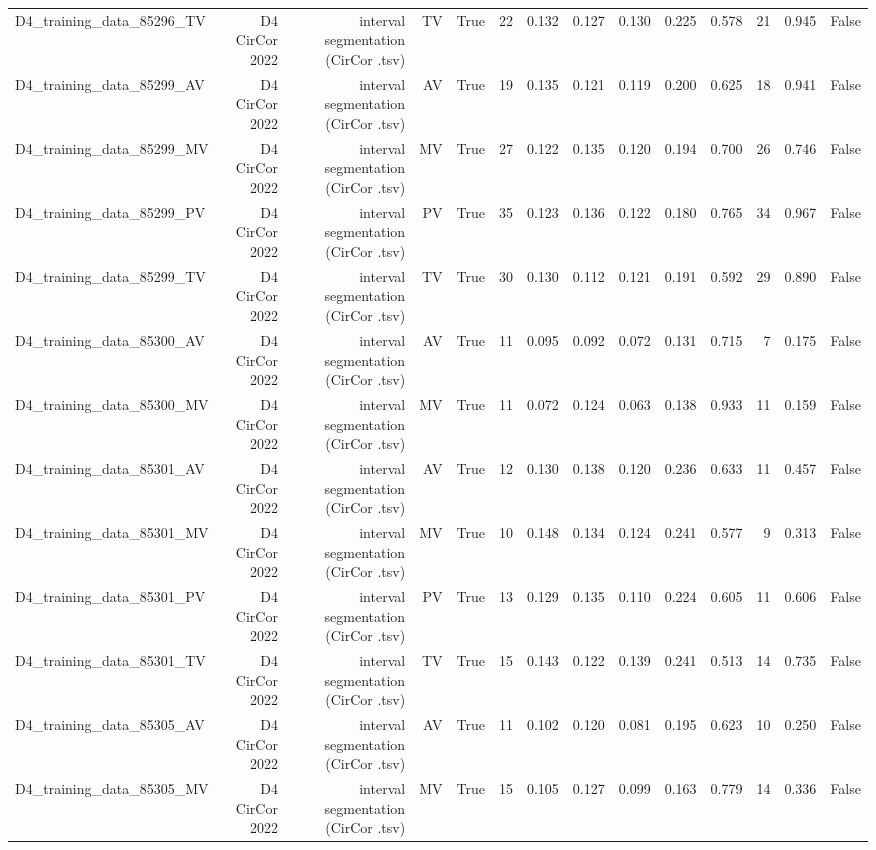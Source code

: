 \begin{table}[htbp]
\begin{tabular}{lrrrrrrrrrrrrr}
    D4\_training\_data\_85296\_TV & D4 CirCor 2022 & interval segmentation (CirCor .tsv) & TV & True & 22 & 0.132 & 0.127 & 0.130 & 0.225 & 0.578 & 21 & 0.945 & False \\
    D4\_training\_data\_85299\_AV & D4 CirCor 2022 & interval segmentation (CirCor .tsv) & AV & True & 19 & 0.135 & 0.121 & 0.119 & 0.200 & 0.625 & 18 & 0.941 & False \\
    D4\_training\_data\_85299\_MV & D4 CirCor 2022 & interval segmentation (CirCor .tsv) & MV & True & 27 & 0.122 & 0.135 & 0.120 & 0.194 & 0.700 & 26 & 0.746 & False \\
    D4\_training\_data\_85299\_PV & D4 CirCor 2022 & interval segmentation (CirCor .tsv) & PV & True & 35 & 0.123 & 0.136 & 0.122 & 0.180 & 0.765 & 34 & 0.967 & False \\
    D4\_training\_data\_85299\_TV & D4 CirCor 2022 & interval segmentation (CirCor .tsv) & TV & True & 30 & 0.130 & 0.112 & 0.121 & 0.191 & 0.592 & 29 & 0.890 & False \\
    D4\_training\_data\_85300\_AV & D4 CirCor 2022 & interval segmentation (CirCor .tsv) & AV & True & 11 & 0.095 & 0.092 & 0.072 & 0.131 & 0.715 & 7 & 0.175 & False \\
    D4\_training\_data\_85300\_MV & D4 CirCor 2022 & interval segmentation (CirCor .tsv) & MV & True & 11 & 0.072 & 0.124 & 0.063 & 0.138 & 0.933 & 11 & 0.159 & False \\
    D4\_training\_data\_85301\_AV & D4 CirCor 2022 & interval segmentation (CirCor .tsv) & AV & True & 12 & 0.130 & 0.138 & 0.120 & 0.236 & 0.633 & 11 & 0.457 & False \\
    D4\_training\_data\_85301\_MV & D4 CirCor 2022 & interval segmentation (CirCor .tsv) & MV & True & 10 & 0.148 & 0.134 & 0.124 & 0.241 & 0.577 & 9 & 0.313 & False \\
    D4\_training\_data\_85301\_PV & D4 CirCor 2022 & interval segmentation (CirCor .tsv) & PV & True & 13 & 0.129 & 0.135 & 0.110 & 0.224 & 0.605 & 11 & 0.606 & False \\
    D4\_training\_data\_85301\_TV & D4 CirCor 2022 & interval segmentation (CirCor .tsv) & TV & True & 15 & 0.143 & 0.122 & 0.139 & 0.241 & 0.513 & 14 & 0.735 & False \\
    D4\_training\_data\_85305\_AV & D4 CirCor 2022 & interval segmentation (CirCor .tsv) & AV & True & 11 & 0.102 & 0.120 & 0.081 & 0.195 & 0.623 & 10 & 0.250 & False \\
    D4\_training\_data\_85305\_MV & D4 CirCor 2022 & interval segmentation (CirCor .tsv) & MV & True & 15 & 0.105 & 0.127 & 0.099 & 0.163 & 0.779 & 14 & 0.336 & False \\

\end{tabular}
\end{table}
